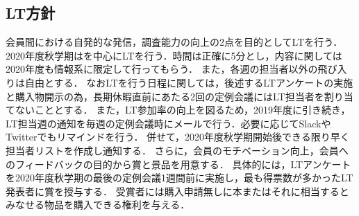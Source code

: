 \subsection*{LT方針}


会員間における自発的な発信，調査能力の向上の2点を目的としてLTを行う．
2020年度秋学期は\firstGrade{}を中心にLTを行う．時間は正確に5分とし，内容に関しては2020年度も情報系に限定して行ってもらう．
また，各週の担当者以外の飛び入りは自由とする．
なおLTを行う日程に関しては，後述するLTアンケートの実施と購入物開示の為，長期休暇直前にあたる2回の定例会議にはLT担当者を割り当てないこととする．
また，LT参加率の向上を図るため，2019年度に引き続き，LT担当週の通知を毎週の定例会議時にメールで行う．必要に応じてSlackやTwitterでもリマインドを行う．
併せて，2020年度秋学期開始後できる限り早く担当者リストを作成し通知する．
さらに，会員のモチベーション向上，会員へのフィードバックの目的から賞と景品を用意する．
具体的には，LTアンケートを2020年度秋学期の最後の定例会議1週間前に実施し，最も得票数が多かったLT発表者に賞を授与する．
受賞者には購入申請無しに本またはそれに相当するとみなせる物品を購入できる権利を与える．
